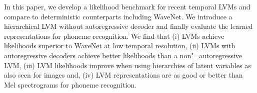 {In this paper, we develop a likelihood benchmark for recent temporal LVMs and compare to deterministic counterparts including WaveNet. We introduce a hierarchical LVM without autoregressive decoder and finally evaluate the learned representations for phoneme recognition. We find that 
(i) LVMs achieve likelihoods superior to WaveNet at low temporal resolution, 
(ii) LVMs with autoregressive decoders achieve better likelihoods than a non"=autoregressive LVM, 
(iii) LVM likelihoods improve when using hierarchies of latent variables as also seen for images and, 
(iv) LVM representations are as good or better than Mel spectrograms for phoneme recognition.


\begin{figure*}[t!]
    \centering
    \begin{multicols}{5}
    \setlength\columnsep{0mm}
    \\
\end{multicols}
\end{figure*}}
